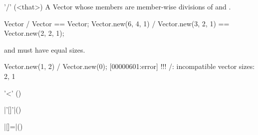 \begin{urbiscriptapi}
\item['/'](<that>)%
  A Vector whose members are member-wise divisions of \this and \that.
\begin{urbiassert}
Vector              / Vector              == Vector;
Vector.new(6, 4, 1) / Vector.new(3, 2, 1) == Vector.new(2, 2, 1);
\end{urbiassert}
  \this and \that must have equal sizes.
\begin{urbiscript}
Vector.new(1, 2) / Vector.new(0);
[00000601:error] !!! /: incompatible vector sizes: 2, 1
\end{urbiscript}

\item['<']()%

\item|'[]'|()%

\item|[]=|()%

\end{urbiscriptapi}

